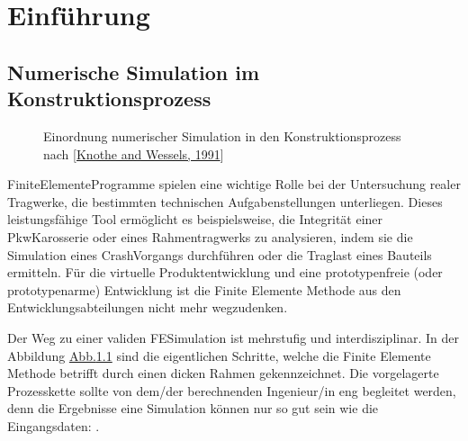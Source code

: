 \documentclass[letterpaper,10pt,german]{jupyterBook}
\let\sphinxpxdimen\pdfpxdimen\else\newdimen\sphinxpxdimen
\begin{document}
\sphinxstepscope


\part{Einführung}

\sphinxstepscope


\chapter{Numerische Simulation im Konstruktionsprozess}
\label{\detokenize{chapters/chapter1/Einf_xfchrung_Konstruktion:numerische-simulation-im-konstruktionsprozess}}\label{\detokenize{chapters/chapter1/Einf_xfchrung_Konstruktion::doc}}
\begin{figure}[htbp]
\centering
\capstart

\noindent\sphinxincludegraphics[height=300\sphinxpxdimen]{{Konstruktionsprozess_knothe}.png}
\caption{Einordnung numerischer Simulation in den Konstruktionsprozess nach {[}\hyperlink{cite.quellen:id4}{Knothe and Wessels, 1991}{]}}\label{\detokenize{chapters/chapter1/Einf_xfchrung_Konstruktion:konstruktionsprozess}}\end{figure}

\sphinxAtStartPar
Finite\sphinxhyphen{}Elemente\sphinxhyphen{}Programme spielen eine wichtige Rolle bei der Untersuchung realer Tragwerke, die bestimmten technischen Aufgabenstellungen unterliegen. Dieses leistungsfähige Tool ermöglicht es beispielsweise, die Integrität einer Pkw\sphinxhyphen{}Karosserie oder eines Rahmentragwerks zu analysieren, indem sie die Simulation eines Crash\sphinxhyphen{}Vorgangs durchführen oder die Traglast eines Bauteils ermitteln. Für die virtuelle Produktentwicklung und eine prototypenfreie (oder prototypenarme) Entwicklung ist die Finite Elemente Methode aus den Entwicklungsabteilungen nicht mehr wegzudenken.

\sphinxAtStartPar
Der Weg zu einer validen FE\sphinxhyphen{}Simulation ist mehrstufig und interdisziplinar. In der Abbildung \hyperref[\detokenize{chapters/chapter1/Einf_xfchrung_Konstruktion:konstruktionsprozess}]{Abb.\@ \ref{\detokenize{chapters/chapter1/Einf_xfchrung_Konstruktion:konstruktionsprozess}}} sind die eigentlichen Schritte, welche die Finite Elemente Methode betrifft durch einen dicken Rahmen gekennzeichnet. Die vorgelagerte Prozesskette sollte von dem/der berechnenden Ingenieur/in eng begleitet werden, denn die Ergebnisse eine Simulation können nur so gut sein wie die Eingangsdaten: .
\end{document}
